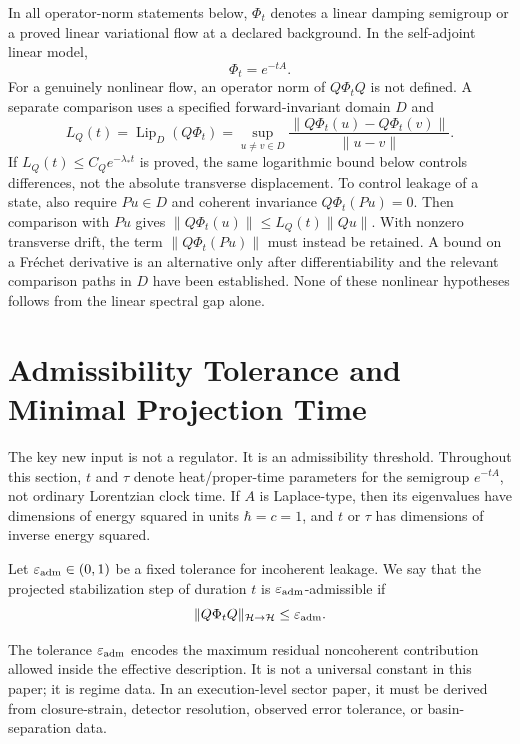 \documentclass[11pt]{article}
\begin{document}
In all operator-norm statements below, \(\Phi_t\) denotes a linear damping
semigroup or a proved linear variational flow at a declared background.
In the self-adjoint linear model,
\[
\Phi_t=e^{-tA}.
\]
For a genuinely nonlinear flow, an operator norm of \(Q\Phi_tQ\) is not
defined. A separate comparison uses a specified forward-invariant domain
\(D\) and
\[
 L_Q(t)=\operatorname{Lip}_D(Q\Phi_t)
 =\sup_{u\ne v\in D}\frac{\|Q\Phi_t(u)-Q\Phi_t(v)\|}{\|u-v\|}.
\]
If \(L_Q(t)\le C_Qe^{-\lambda_\ast t}\) is proved, the same logarithmic
bound below controls differences, not the absolute transverse displacement.
To control leakage of a state, also require \(Pu\in D\) and coherent
invariance \(Q\Phi_t(Pu)=0\). Then comparison with \(Pu\) gives
\(\|Q\Phi_t(u)\|\le L_Q(t)\|Qu\|\). With nonzero transverse drift,
the term \(\|Q\Phi_t(Pu)\|\) must instead be retained. A bound on a
Fr\'echet derivative is an alternative only after differentiability and
the relevant comparison paths in \(D\) have been established. None of
these nonlinear hypotheses follows from the linear spectral gap alone.

\section{Admissibility Tolerance and Minimal Projection Time}

The key new input is not a regulator. It is an admissibility threshold.
Throughout this section, \(t\) and \(\tau\) denote heat/proper-time parameters for the semigroup \(e^{-tA}\), not ordinary Lorentzian clock time. If \(A\) is Laplace-type, then its eigenvalues have dimensions of energy squared in units \(\hbar=c=1\), and \(t\) or \(\tau\) has dimensions of inverse energy squared.

\begin{definition}
Let \(\varepsilon_{\rm adm}\in(0,1)\) be a fixed tolerance for incoherent leakage. We say that the projected stabilization step of duration \(t\) is \(\varepsilon_{\rm adm}\)-admissible if
\[
\|Q\Phi_t Q\|_{\mathcal H\to\mathcal H}
\le \varepsilon_{\rm adm}.
\]
\end{definition}

The tolerance \(\varepsilon_{\rm adm}\) encodes the maximum residual noncoherent contribution allowed inside the effective description. It is not a universal constant in this paper; it is regime data. In an execution-level sector paper, it must be derived from closure-strain, detector resolution, observed error tolerance, or basin-separation data.
\end{document}
